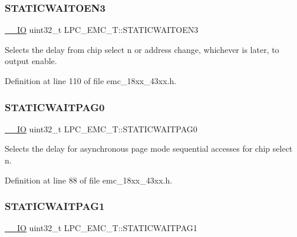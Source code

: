 \subsubsection{\texorpdfstring{S\+T\+A\+T\+I\+C\+W\+A\+I\+T\+O\+E\+N3}{STATICWAITOEN3}}
{\footnotesize\ttfamily \hyperlink{core__sc300_8h_aec43007d9998a0a0e01faede4133d6be}{\+\_\+\+\_\+\+IO} uint32\+\_\+t L\+P\+C\+\_\+\+E\+M\+C\+\_\+\+T\+::\+S\+T\+A\+T\+I\+C\+W\+A\+I\+T\+O\+E\+N3}

Selects the delay from chip select n or address change, whichever is later, to output enable. 

Definition at line 110 of file emc\+\_\+18xx\+\_\+43xx.\+h.

\mbox{\label{struct_l_p_c___e_m_c___t_ab37cf3521293b413d282ff2dd0f5103f}} 
\subsubsection{\texorpdfstring{S\+T\+A\+T\+I\+C\+W\+A\+I\+T\+P\+A\+G0}{STATICWAITPAG0}}
{\footnotesize\ttfamily \hyperlink{core__sc300_8h_aec43007d9998a0a0e01faede4133d6be}{\+\_\+\+\_\+\+IO} uint32\+\_\+t L\+P\+C\+\_\+\+E\+M\+C\+\_\+\+T\+::\+S\+T\+A\+T\+I\+C\+W\+A\+I\+T\+P\+A\+G0}

Selects the delay for asynchronous page mode sequential accesses for chip select n. 

Definition at line 88 of file emc\+\_\+18xx\+\_\+43xx.\+h.

\mbox{\label{struct_l_p_c___e_m_c___t_ab09ca5028b2d77a1be5c1b915d565cf6}} 
\subsubsection{\texorpdfstring{S\+T\+A\+T\+I\+C\+W\+A\+I\+T\+P\+A\+G1}{STATICWAITPAG1}}
{\footnotesize\ttfamily \hyperlink{core__sc300_8h_aec43007d9998a0a0e01faede4133d6be}{\+\_\+\+\_\+\+IO} uint32\+\_\+t L\+P\+C\+\_\+\+E\+M\+C\+\_\+\+T\+::\+S\+T\+A\+T\+I\+C\+W\+A\+I\+T\+P\+A\+G1}


